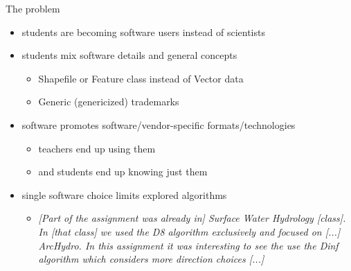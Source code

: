 \documentclass[xcolor={dvipsnames,usenames},beamer]{beamer}
\begin{document}
\begin{frame}{The problem}



\begin{itemize}
 \item students are becoming software users instead of scientists
 \item students mix software details and general concepts
 \begin{itemize}
  \item Shapefile or Feature class instead of Vector data
  \item Generic (genericized) trademarks
 \end{itemize}
 \item software promotes software/vendor-specific formats/technologies
 \begin{itemize}
  \item teachers end up using them
  \item and students end up knowing just them
 \end{itemize}
 \item single software choice limits explored algorithms
 \begin{itemize}
  \item \emph{[Part of the assignment was already in] Surface Water Hydrology [class].
In [that class] we used the D8 algorithm exclusively and focused on [...] ArcHydro.
In this assignment it was interesting to see the use the Dinf
algorithm which considers more direction choices [...]}
 \end{itemize}

\end{itemize}

\end{frame}
\end{document}
